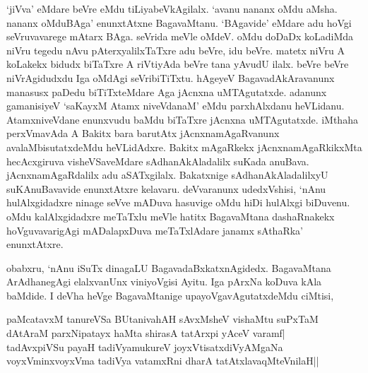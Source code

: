 `jiVva' eMdare beVre eMdu tiLiyabeVkAgilalx. `avanu nananx oMdu aMsha. nananx oMduBAga' enunxtAtxne BagavaMtanu. `BAgavide' eMdare adu hoVgi seVruvavarege mAtarx BAga. seVrida meVle oMdeV. oMdu doDaDx koLadiMda niVru tegedu nAvu pAterxyalilxTaTxre adu beVre, idu beVre. matetx niVru A koLakekx bidudx biTaTxre A riVtiyAda beVre tana yAvudU ilalx. beVre beVre niVrAgidudxdu Iga oMdAgi seVribiTiTxtu. hAgeyeV BagavadAkAravanunx manasusx paDedu biTiTxteMdare Aga jAcnxna uMTAgutatxde. adanunx gamanisiyeV `saKayxM Atamx niveVdanaM' eMdu parxhAlxdanu heVLidanu. AtamxniveVdane enunxvudu baMdu biTaTxre jAcnxna uMTAgutatxde. iMthaha perxVmavAda A Bakitx bara barutAtx jAcnxnamAgaRvanunx avalaMbisutatxdeMdu heVLidAdxre. Bakitx mAgaRkekx jAcnxnamAgaRkikxMta hecAcxgiruva visheVSaveMdare sAdhanAkAladalilx suKada anuBava. jAcnxnamAgaRdalilx adu aSATxgilalx. Bakatxnige sAdhanAkAladalilxyU suKAnuBavavide enunxtAtxre kelavaru. deVvaranunx udedxVshisi, `nAnu hulAlxgidadxre ninage seVve mADuva hasuvige oMdu hiDi hulAlxgi biDuvenu. oMdu kalAlxgidadxre meTaTxlu meVle hatitx BagavaMtana dashaRnakekx hoVguvavarigAgi mADalapxDuva meTaTxlAdare janamx sAthaRka' enunxtAtxre.

obabxru, `nAnu iSuTx dinagaLU BagavadaBxkatxnAgidedx. BagavaMtana ArAdhanegAgi elalxvanUnx viniyoVgisi Ayitu. Iga pArxNa koDuva kAla baMdide. I deVha heVge BagavaMtanige upayoVgavAgutatxdeMdu ciMtisi,

\begin{shloka}
paMcatavxM tanureVSa BUtanivahAH sAvxMsheV vishaMtu suPxTaM\\
dAtAraM parxNipatayx haMta shirasA tatArxpi yAceV varamf|\\
tadAvxpiVSu payaH tadiVyamukureV joyxVtisatxdiVyAMgaNa\\
voyxVminxvoyxVma tadiVya vatamxRni dharA tatAtxlavaqMteV\s nilaH||
\end{shloka}

